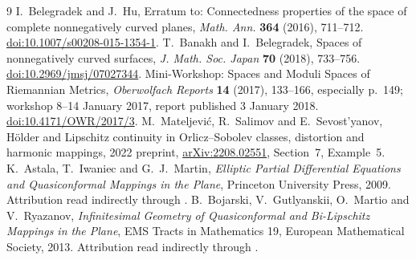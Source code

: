 \documentclass[11pt]{article}
\begin{document}
\begin{thebibliography}{9}
\small
{} I.~Belegradek and J.~Hu,
Erratum to: Connectedness properties of the space of complete nonnegatively curved planes,
\emph{Math. Ann.} \textbf{364} (2016), 711--712.
\href{https://doi.org/10.1007/s00208-015-1354-1}{doi:10.1007/s00208-015-1354-1}.
 T.~Banakh and I.~Belegradek,
Spaces of nonnegatively curved surfaces,
\emph{J. Math. Soc. Japan} \textbf{70} (2018), 733--756.
\href{https://doi.org/10.2969/jmsj/07027344}{doi:10.2969/jmsj/07027344}.
 Mini-Workshop: Spaces and Moduli Spaces of Riemannian Metrics,
\emph{Oberwolfach Reports} \textbf{14} (2017), 133--166, especially p.~149;
workshop 8--14 January 2017, report published 3 January 2018.
\href{https://doi.org/10.4171/OWR/2017/3}{doi:10.4171/OWR/2017/3}.
 M.~Mateljevi\'c, R.~Salimov and E.~Sevost'yanov,
H\"older and Lipschitz continuity in Orlicz--Sobolev classes, distortion and harmonic mappings,
2022 preprint, \href{https://arxiv.org/abs/2208.02551}{arXiv:2208.02551}, Section~7, Example~5.
 K.~Astala, T.~Iwaniec and G.~J.~Martin,
\emph{Elliptic Partial Differential Equations and Quasiconformal Mappings in the Plane},
Princeton University Press, 2009. Attribution read indirectly through \cite{MSS22}.
 B.~Bojarski, V.~Gutlyanskii, O.~Martio and V.~Ryazanov,
\emph{Infinitesimal Geometry of Quasiconformal and Bi-Lipschitz Mappings in the Plane},
EMS Tracts in Mathematics 19, European Mathematical Society, 2013.
Attribution read indirectly through \cite{MSS22}.
\end{thebibliography}
\end{document}
